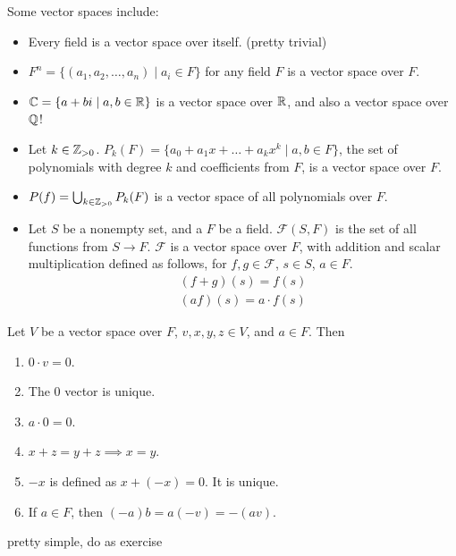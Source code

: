 \documentclass[12pt]{article}
\begin{document}
\begin{ex} Some vector spaces include:
    \begin{itemize}
        \item Every field is a vector space over itself. (pretty trivial)
        \item $F^n = \{ (a_{1},a_{2},\dots,a_{n}) \mid a_{i} \in F \}$ for any field $F$ is a vector space over $F$.
        \item $\mathbb{C} = \{ a+bi \mid a,b \in \mathbb{R} \}$ is a vector space over $\mathbb{R}$, and also a vector space over $\mathbb{Q}$!
        \item Let $k \in  \mathbb{Z}_{>0}$. $P_{k}(F) = \{ a_{0} + a_{1}x + \dots + a_{k}x^k \mid a,b \in F \}$, the set of polynomials with degree $k$ and coefficients from $F$, is a vector space over $F$.
        \item $P(f) = \bigcup_{k \in \mathbb{Z}_{>0}} P_{k}(F)$ is a vector space of all polynomials over $F$.
        \item Let $S$ be a nonempty set, and a $F$ be a field. $\mathcal{F}(S,F)$ is the set of all functions from $S \to F$. $\mathcal{F}$ is a vector space over $F$, with addition and scalar multiplication defined as follows, for $f, g \in \mathcal{F}$, $s \in S$, $a \in F$.
            \begin{gather*}
                (f+g)(s) = f(s) \\
                (af)(s) = a \cdot f(s)
            \end{gather*}
    \end{itemize}
\end{ex}

\begin{thm}
    Let $V$ be a vector space over $F$, $v,x,y,z \in V$, and $a \in F$. Then
    \begin{enumerate}[label=(\roman*)]
        \item $0 \cdot v = 0$.
        \item The $0$ vector is unique.
        \item $a \cdot 0 = 0$.
        \item $x + z = y + z \implies x=y$.
        \item $-x$ is defined as $x + (-x) = 0$. It is unique.
        \item If $a \in F$, then $(-a)b = a(-v) = -(av)$.
    \end{enumerate}
\end{thm}
\begin{pf}
    pretty simple, do as exercise
\end{pf}
\end{document}
